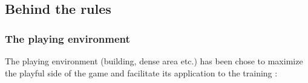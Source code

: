 \documentclass[11pt]{article} %
\begin{document}
\subsection{Behind the rules}
\subsubsection{The playing environment}
The playing environment (building, dense area etc.) has been chose to maximize the playful side of the game and facilitate its application to the training : 
\end{document}
